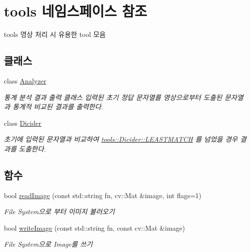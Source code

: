 \hypertarget{namespacetools}{}\section{tools 네임스페이스 참조}
\label{namespacetools}


tools 영상 처리 시 유용한 tool 모음  


\subsection*{클래스}
\begin{DoxyCompactItemize}
\item 
class \hyperlink{classtools_1_1_analyzer}{Analyzer}
\begin{DoxyCompactList}\small\item\em 통계 분석 결과 출력 클래스 입력된 초기 정답 문자열를 영상으로부터 도출된 문자열과 통계적 비교된 결과를 출력한다. \end{DoxyCompactList}\item 
class \hyperlink{classtools_1_1_dicider}{Dicider}
\begin{DoxyCompactList}\small\item\em 초기에 입력된 문자열과 비교하여 \hyperlink{classtools_1_1_dicider_afdc1fb561a2ed8037d0fa87b69a7792d}{tools\+::\+Dicider\+::\+L\+E\+A\+S\+T\+M\+A\+T\+CH} 를 넘었을 경우 결과를 도출한다. \end{DoxyCompactList}\end{DoxyCompactItemize}
\subsection*{함수}
\begin{DoxyCompactItemize}
\item 
bool \hyperlink{namespacetools_a0dabcdc87de76f44797f16ade56944cf}{read\+Image} (const std\+::string fn, cv\+::\+Mat \&image, int flags=1)
\begin{DoxyCompactList}\small\item\em File System으로 부터 이미지 불러오기 \end{DoxyCompactList}\item 
bool \hyperlink{namespacetools_a22a0c0860e714d4b350f17ec02ec2b6b}{write\+Image} (const std\+::string fn, const cv\+::\+Mat \&image)
\begin{DoxyCompactList}\small\item\em File System으로 Image를 쓰기 \end{DoxyCompactList}\end{DoxyCompactItemize}


